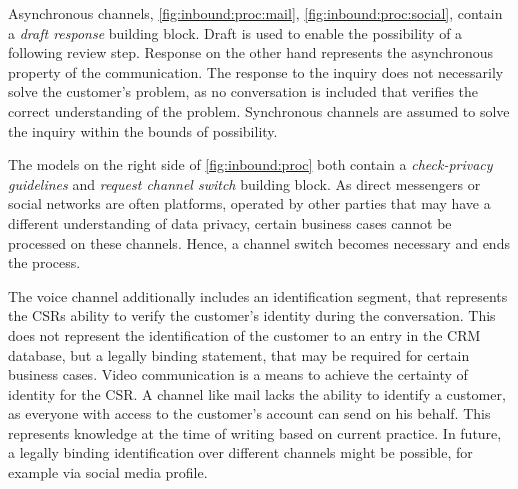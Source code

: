 	 Asynchronous channels, \Fig \ref{fig:inbound:proc:mail}, \ref{fig:inbound:proc:social}, contain a \textit{draft response} building block. Draft is used to enable the possibility of a following review step. Response on the other hand represents the asynchronous property of the communication. The response to the inquiry does not necessarily solve the customer's problem, as no conversation is included that verifies the correct understanding of the problem. Synchronous channels are assumed to solve the inquiry within the bounds of possibility. 
	 
	 The models on the right side of \Fig \ref{fig:inbound:proc} both contain a \textit{check-privacy guidelines} and \textit{request channel switch} building block. As direct messengers or social networks are often platforms, operated by other parties that may have a different understanding of data privacy, certain business cases cannot be processed on these channels. Hence, a channel switch becomes necessary and ends the process. 
	 
	 The voice channel additionally includes an identification segment, that represents the \acrshort{CSR}s ability to verify the customer's identity during the conversation. This does not represent the identification of the customer to an entry in the \acrshort{CRM} database, but a legally binding statement, that may be required for certain business cases. Video communication is a means to achieve the certainty of identity for the \acrshort{CSR}.
	 A channel like mail lacks the ability to identify a customer, as everyone with access to the customer's account can send on his behalf. This represents knowledge at the time of writing based on current practice. In future, a legally binding identification over different channels might be possible, for example via social media profile.
	 
